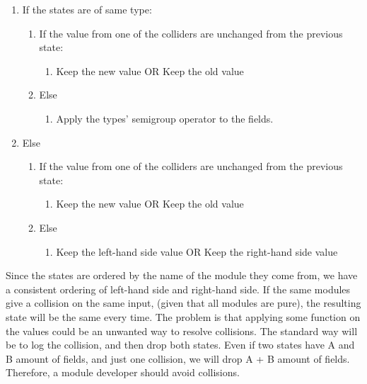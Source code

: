 \begin{enumerate}
  \item If the states are of same type:
    \begin{enumerate}
      \item If the value from one of the colliders are unchanged from the previous state:
        \begin{enumerate}
          \item Keep the new value OR Keep the old value
        \end{enumerate}
      \item Else
        \begin{enumerate}
          \item Apply the types' semigroup operator to the fields.
        \end{enumerate}
    \end{enumerate}
  \item Else
    \begin{enumerate}
      \item If the value from one of the colliders are unchanged from the previous state:
        \begin{enumerate}
          \item Keep the new value OR Keep the old value
        \end{enumerate}
      \item Else
        \begin{enumerate}
          \item Keep the left-hand side value OR Keep the right-hand side value
        \end{enumerate}
    \end{enumerate}
\end{enumerate}

Since the states are ordered by the name of the module they come from, we
have a consistent ordering of left-hand side and right-hand side. If the same
modules give a collision on the same input, (given that all modules are pure), the
resulting state will be the same every time. The problem is that applying some
function on the values could be an unwanted way to resolve collisions. The
standard way will be to log the collision, and then drop both states. Even
if two states have A and B amount of fields, and just one collision, we will
drop A + B amount of fields. Therefore, a module developer should avoid
collisions.



